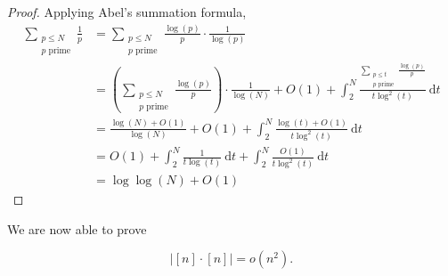 \documentclass[12pt,reqno]{amsart}
\begin{document}
\begin{proof}
Applying Abel's summation formula,
\begin{align*}
\sum  _{\substack{ p \leq N \\p \text{ prime}  }} \frac{1}{p} & = \sum _{\substack{ p \leq N \\ p \text{ prime}  }}   \frac{\log \left( p \right) }{p} \cdot \frac{1}{\log \left( p \right) } \\
& = \left( \sum _{\substack{ p \leq N \\ p \text{ prime}  }} \frac{\log \left( p \right) }{p}  \right) \cdot \frac{1}{\log \left( N \right) } + O(1) + \int_{2}^{N} \frac{ \sum _{\substack{ p \leq t \\ p \text{ prime}  }}\frac{ \log \left( p \right) }{p} }{t \log ^{2}\left( t \right) }  ~\mathrm{d} t \\
& = \frac{ \log \left( N \right) + O(1)  }{\log \left( N \right) } + O(1) + \int_{2}^{N} \frac{\log \left( t \right) + O(1)}{t \log ^{2}\left( t \right) }  ~\mathrm{d} t\\
& = O(1) + \int_{2}^{N} \frac{1}{t \log \left( t \right) }  ~\mathrm{d} t + \int_{2}^{N} \frac{O(1)}{t \log ^{2}\left( t \right) }  ~\mathrm{d} t \\
& = \log\log \left( N \right) + O(1)
\end{align*}
\end{proof}

We are now able to prove

\begin{theorem*}
    \[
        \left\lvert [n] \cdot [n] \right\rvert = o(n^{2})
    .\]
\end{theorem*}
\end{document}
